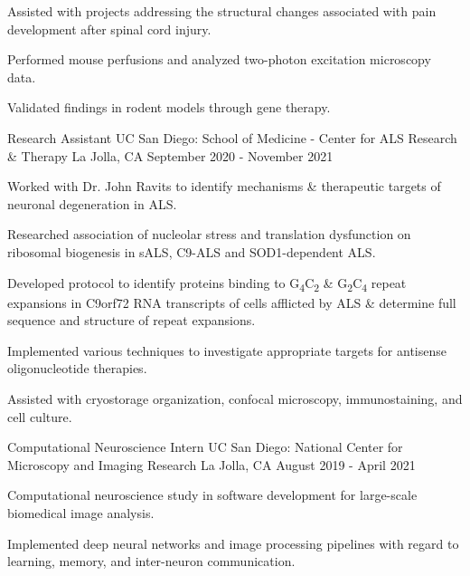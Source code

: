 \begin{cventries}
{\begin{cvitems}
    \item {Assisted with projects addressing the structural changes associated with pain development after spinal cord injury.}
    \item {Performed mouse perfusions and analyzed two-photon excitation microscopy data.}
    \item {Validated findings in rodent models through gene therapy.}
  \end{cvitems}
}
\cventry
{Research Assistant} %
{UC San Diego: School of Medicine - Center for ALS Research \& Therapy} %
{La Jolla, CA} %
{September 2020 - November 2021} %
{
  \begin{cvitems} %
    \item {Worked with Dr. John Ravits to identify mechanisms \& therapeutic targets of neuronal degeneration in ALS.}
    \item {Researched association of nucleolar stress and translation dysfunction on ribosomal biogenesis in sALS, C9-ALS and SOD1-dependent ALS.}
    \item {Developed protocol to identify proteins binding to G\textsubscript{4}C\textsubscript{2} \& G\textsubscript{2}C\textsubscript{4} repeat expansions in C9orf72 RNA transcripts of cells afflicted by ALS \& determine full sequence and structure of repeat expansions.}
    \item {Implemented various techniques to investigate appropriate targets for antisense oligonucleotide therapies.}
    \item {Assisted with cryostorage organization, confocal microscopy, immunostaining, and cell culture.}
  \end{cvitems}
}
\cventry
{Computational Neuroscience Intern} %
{UC San Diego: National Center for Microscopy and Imaging Research} %
{La Jolla, CA} %
{August 2019 - April 2021} %
{
  \begin{cvitems} %
    \item {Computational neuroscience study in software development for large-scale biomedical image analysis.}
    \item {Implemented deep neural networks and image processing pipelines with regard to learning, memory, and inter-neuron communication.}

\end{cvitems}}
\end{cventries}
